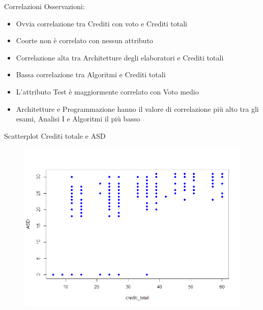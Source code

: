 \documentclass{beamer}
\begin{document}
\begin{frame}{Correlazioni}
  Osservazioni:
  \begin{itemize}
      \item Ovvia correlazione tra Crediti con voto e Crediti totali
      \item Coorte non è correlato con nessun attributo
      \item Correlazione alta tra Architetture degli elaboratori e Crediti totali
      \item Bassa correlazione tra Algoritmi e Crediti totali
      \item L'attributo Test è maggiormente correlato con Voto medio
      \item Architetture e Programmazione hanno il valore di correlazione più alto tra gli esami, Analisi I e Algoritmi il più basso
  \end{itemize}
\end{frame}

\begin{frame}{Scatterplot Crediti totale e ASD}
    \begin{figure}[bt]
      \begin{center}
        \includegraphics[width=\textwidth]{../img/creditiAsd.png}
      \end{center}
    \end{figure}
  \end{frame}
\end{document}
